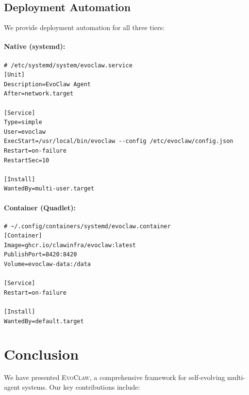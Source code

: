 \documentclass{article}
\newcommand{\evoclaw}{\textsc{EvoClaw}}
\begin{document}
\subsection{Deployment Automation}

We provide deployment automation for all three tiers:

\paragraph{Native (systemd):}
\begin{lstlisting}[basicstyle=\ttfamily\footnotesize]
# /etc/systemd/system/evoclaw.service
[Unit]
Description=EvoClaw Agent
After=network.target

[Service]
Type=simple
User=evoclaw
ExecStart=/usr/local/bin/evoclaw --config /etc/evoclaw/config.json
Restart=on-failure
RestartSec=10

[Install]
WantedBy=multi-user.target
\end{lstlisting}

\paragraph{Container (Quadlet):}
\begin{lstlisting}[basicstyle=\ttfamily\footnotesize]
# ~/.config/containers/systemd/evoclaw.container
[Container]
Image=ghcr.io/clawinfra/evoclaw:latest
PublishPort=8420:8420
Volume=evoclaw-data:/data

[Service]
Restart=on-failure

[Install]
WantedBy=default.target
\end{lstlisting}


\section{Conclusion}
\label{sec:conclusion}

We have presented \evoclaw{}, a comprehensive framework for self-evolving multi-agent systems. Our key contributions include:
\end{document}
